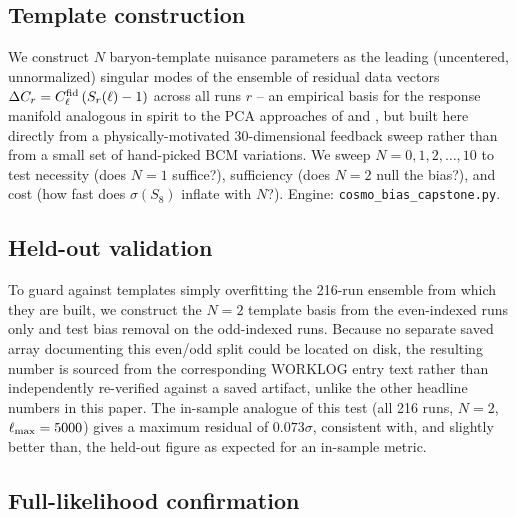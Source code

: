 \documentclass[11pt]{article}
\begin{document}
\subsection{Template construction}\label{sec:templates}

We construct $N$ baryon-template nuisance parameters as the leading (uncentered,
unnormalized) singular modes of the ensemble of residual data vectors
$\Delta C_r = C_\ell^{\rm fid}\,(S_r(\ell)-1)$ across all runs $r$ -- an
empirical basis for the response manifold analogous in spirit to the PCA
approaches of \citet{eifler2015} and \citet{huang2019}, but built here directly
from a physically-motivated 30-dimensional feedback sweep rather than from a
small set of hand-picked BCM variations. We sweep $N=0,1,2,\dots,10$ to test
necessity (does $N=1$ suffice?), sufficiency (does $N=2$ null the bias?), and
cost (how fast does $\sigma(S_8)$ inflate with $N$?). Engine:
\texttt{cosmo\_bias\_capstone.py}.

\subsection{Held-out validation}\label{sec:heldout}

To guard against templates simply overfitting the 216-run ensemble from which
they are built, we construct the $N=2$ template basis from the even-indexed
runs only and test bias removal on the odd-indexed runs. Because no separate
saved array documenting this even/odd split could be located on disk, the
resulting number is sourced from the corresponding WORKLOG entry text rather
than independently re-verified against a saved artifact, unlike the other
headline numbers in this paper. %
The in-sample analogue of this test (all 216 runs, $N=2$, $\ell_{\rm max}=5000$)
gives a maximum residual of $0.073\sigma$, consistent with, and slightly better
than, the held-out figure as expected for an in-sample metric. %

\subsection{Full-likelihood confirmation}\label{sec:fulllikelihood}
\end{document}
